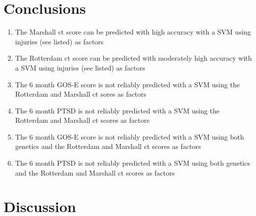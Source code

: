 \documentclass[11pt]{article}
\begin{document}
\section{Conclusions}

\begin{enumerate}
  \item{The Marshall \gls{ct} score can be predicted with high accuracy with a SVM using injuries (see listed) as factors}
  \item{The Rotterdam \gls{ct} score can be predicted with moderately high accuracy with a SVM using injuries (see listed) as factors}
  \item{The 6 month GOS-E score is not reliably predicted with a SVM using the Rotterdam and Marshall \gls{ct} sores as factors}
  \item{The 6 month PTSD is not reliably predicted with a SVM using the Rotterdam and Marshall \gls{ct} scores as factors}
  \item{The 6 month GOS-E score is not reliably predicted with a SVM using both genetics and the Rotterdam and Marshall \gls{ct} scores as factors}
  \item{The 6 month PTSD is not reliably predicted with a SVM using both genetics and the Rotterdam and Marshall \gls{ct} scores as factors}
\end{enumerate}
\section{Discussion}
\end{document}
